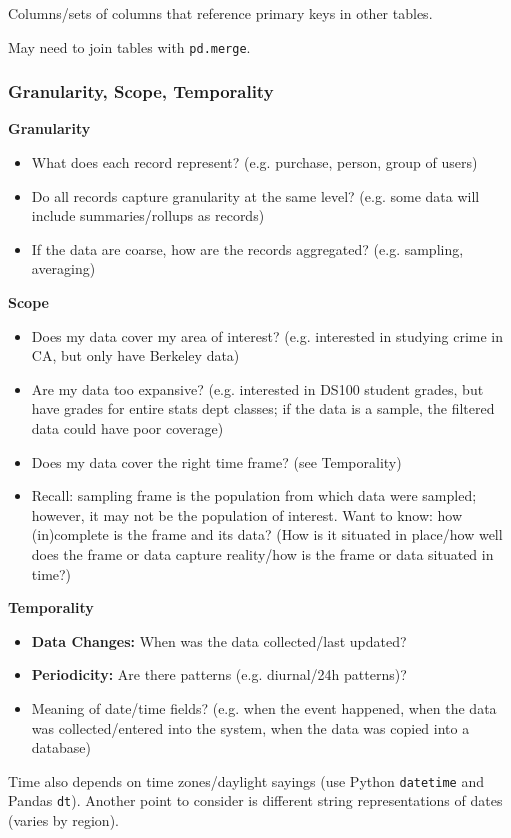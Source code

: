 \begin{definition}{Columns/sets of columns that reference primary keys in other tables.

May need to join tables with \texttt{pd.merge}.
}
\end{definition}

\subsubsection{Granularity, Scope, Temporality}

\textbf{Granularity}
\begin{itemize}
\item What does each record represent? (e.g. purchase, person, group of users)
\item Do all records capture granularity at the same level? (e.g. some data will include summaries/rollups as records)
\item If the data are coarse, how are the records aggregated? (e.g. sampling, averaging)
\end{itemize}

\textbf{Scope}
\begin{itemize}
\item Does my data cover my area of interest? (e.g. interested in studying crime in CA, but only have Berkeley data)
\item Are my data too expansive? (e.g. interested in DS100 student grades, but have grades for entire stats dept classes; if the data is a sample, the filtered data could have poor coverage)
\item Does my data cover the right time frame? (see Temporality)
\item Recall: sampling frame is the population from which data were sampled; however, it may not be the population of interest. Want to know: how (in)complete is the frame and its data? (How is it situated in place/how well does the frame or data capture reality/how is the frame or data situated in time?)
\end{itemize}

\textbf{Temporality}
\begin{itemize}
\item \textbf{Data Changes:} When was the data collected/last updated?
\item \textbf{Periodicity:} Are there patterns (e.g. diurnal/24h patterns)?
\item Meaning of date/time fields? (e.g. when the event happened, when the data was collected/entered into the system, when the data was copied into a database)
\end{itemize}
Time also depends on time zones/daylight sayings (use Python \texttt{datetime} and Pandas \texttt{dt}). Another point to consider is different string representations of dates (varies by region).

